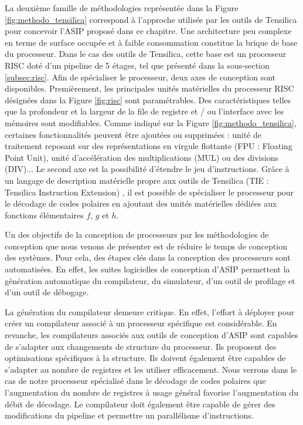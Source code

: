La deuxième famille de méthodologies représentée dans la Figure \ref{fig:methodo_tensilica} correspond à l'approche utilisée par les outils de Tensilica pour concevoir l'ASIP proposé dans ce chapitre. Une architecture peu complexe en terme de surface occupée et à faible consommation constitue la brique de base du processeur. Dans le cas des outils de Tensilica, cette base est un processeur RISC doté d'un pipeline de 5 étages, tel que présenté dans la sous-section \ref{subsec:risc}. Afin de spécialiser le processeur, deux axes de conception sont disponibles. Premièrement, les principales unités matérielles du processeur RISC désignées dans la Figure \ref{fig:risc} sont paramétrables. Des caractéristiques telles que la profondeur et la largeur de la file de registre et / ou l'interface avec les mémoires sont modifiables. Comme indiqué sur la Figure \ref{fig:methodo_tensilica}, certaines fonctionnalités peuvent être ajoutées ou supprimées : unité de traitement reposant sur des représentations en virgule flottante (FPU : Floating Point Unit), unité d'accélération des multiplications (MUL) ou des divisions (DIV)... Le second axe est la possibilité d'étendre le jeu d'instructions. Grâce à un langage de description matérielle propre aux outils de Tensilica (TIE : Tensilica Instruction Extension) \cite{tie2017reference}, il est possible de spécialiser le processeur pour le décodage de codes polaires en ajoutant des unités matérielles dédiées aux fonctions élémentaires $f$, $g$ et $h$.

Un des objectifs de la conception de processeurs par les méthodologies de conception que nous venons de présenter est de réduire le temps de conception des systèmes. Pour cela, des étapes clés dans la conception des processeurs sont automatisées. En effet, les suites logicielles de conception d'ASIP permettent la génération automatique du compilateur, du simulateur, d'un outil de profilage et d'un outil de débogage. 

La génération du compilateur demeure critique. En effet, l'effort à déployer pour créer un compilateur associé à un processeur spécifique est considérable. En revanche, les compilateurs associés aux outils de conception d'ASIP sont capables de s'adapter aux changements de structure du processeur. Ils proposent des optimisations spécifiques à la structure. Ils doivent également être capables de s'adapter au nombre de registres et les utiliser efficacement. Nous verrons dans le cas de notre processeur spécialisé dans le décodage de codes polaires que l'augmentation du nombre de registres à usage général favorise l'augmentation du débit de décodage. Le compilateur doit également être capable de gérer des modifications du pipeline et permettre un parallélisme d'instructions.

